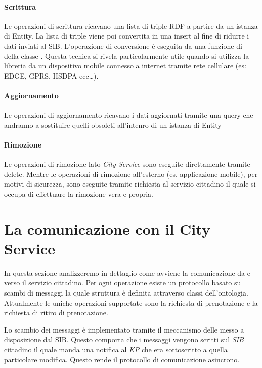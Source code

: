 \paragraph{Scrittura} Le operazioni di scrittura ricavano una lista di triple RDF a partire da un istanza di Entity. La lista di triple viene poi convertita in una  insert al fine di ridurre i dati inviati al SIB. L'operazione di conversione è eseguita da una funzione di della  classe . Questa tecnica si rivela particolarmente utile quando si utilizza la libreria da un dispositivo mobile connesso a internet tramite rete cellulare (es: EDGE, GPRS, HSDPA ecc\dots).

\paragraph{Aggiornamento} Le operazioni di aggiornamento ricavano i dati aggiornati tramite una query  che andranno a sostituire quelli obsoleti all'intenro di un istanza di Entity

\paragraph{Rimozione} Le operazioni di rimozione lato \emph{City Service} sono eseguite direttamente tramite  delete. Mentre le operazioni di rimozione all'esterno (es. applicazione mobile), per motivi di sicurezza, sono eseguite tramite richiesta al servizio cittadino il quale si occupa di effettuare la rimozione vera e propria.

\section{La comunicazione con il City Service}\label{sec:protocol}

In questa sezione analizzeremo in dettaglio come avviene la comunicazione da e verso il servizio cittadino. Per ogni operazione esiste un protocollo basato su scambi di messaggi la quale struttura è definita attraverso classi dell'ontologia. Attualmente le uniche operazioni supportate sono la richiesta di prenotazione e la richiesta di ritiro di prenotazione.

Lo scambio dei messaggi è implementato tramite il meccanismo delle  messo a disposizione dal SIB. Questo comporta che i messaggi vengono scritti sul \emph{SIB} cittadino il quale manda una notifica al \emph{KP} che era sottoscritto a quella particolare modifica. Questo rende il protocollo di comunicazione asincrono.


